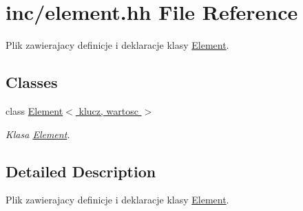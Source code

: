 \hypertarget{element_8hh}{\section{inc/element.hh File Reference}
\label{element_8hh}
}


Plik zawierajacy definicje i deklaracje klasy \hyperlink{class_element}{Element}.  


\subsection*{Classes}
\begin{DoxyCompactItemize}
\item 
class \hyperlink{class_element}{Element$<$ klucz, wartosc $>$}
\begin{DoxyCompactList}\small\item\em Klasa \hyperlink{class_element}{Element}. \end{DoxyCompactList}\end{DoxyCompactItemize}


\subsection{Detailed Description}
Plik zawierajacy definicje i deklaracje klasy \hyperlink{class_element}{Element}. 